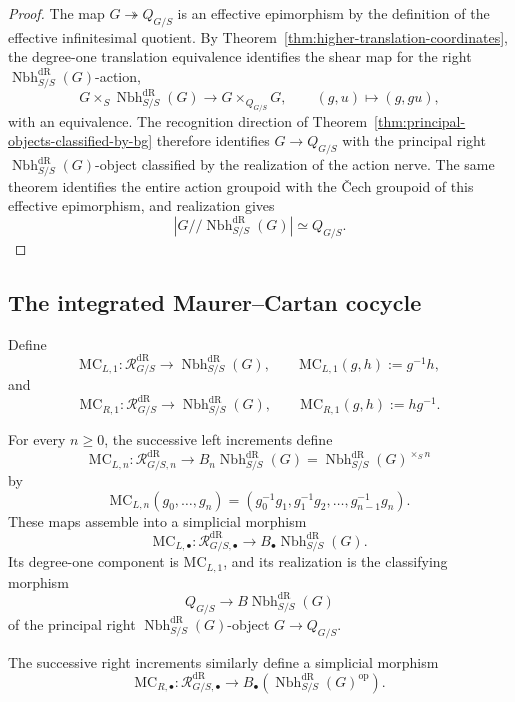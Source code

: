 \begin{proof}
The map $G\twoheadrightarrow Q_{G/S}$ is an effective epimorphism by the
definition of the effective infinitesimal quotient.  By
Theorem~\ref{thm:higher-translation-coordinates}, the degree-one translation
equivalence identifies the shear map for the right $\operatorname{Nbh}^{\mathrm{dR}}_{S/S}(G)$-action,
\[
    G\times_S\operatorname{Nbh}^{\mathrm{dR}}_{S/S}(G)
    \longrightarrow
    G\times_{Q_{G/S}}G,
    \qquad
    (g,u)\longmapsto(g,gu),
\]
with an equivalence.  The recognition direction of
Theorem~\ref{thm:principal-objects-classified-by-bg} therefore identifies
$G\to Q_{G/S}$ with the principal right $\operatorname{Nbh}^{\mathrm{dR}}_{S/S}(G)$-object classified by the
realization of the action nerve.  The same theorem identifies
the entire action groupoid with the \v{C}ech groupoid of this effective
epimorphism, and realization gives
\[
    |G/\!/\operatorname{Nbh}^{\mathrm{dR}}_{S/S}(G)|\simeq Q_{G/S}.
\]
\end{proof}

\subsection{The integrated Maurer--Cartan cocycle}

\begin{definition}
\label{def:formal-mc-projections}
Define
\[
    \mathrm{MC}_{L,1}:
    \mathcal R^{\mathrm{dR}}_{G/S}\to\operatorname{Nbh}^{\mathrm{dR}}_{S/S}(G),
    \qquad
    \mathrm{MC}_{L,1}(g,h):=g^{-1}h,
\]
and
\[
    \mathrm{MC}_{R,1}:
    \mathcal R^{\mathrm{dR}}_{G/S}\to\operatorname{Nbh}^{\mathrm{dR}}_{S/S}(G),
    \qquad
    \mathrm{MC}_{R,1}(g,h):=hg^{-1}.
\]
\end{definition}

\begin{theorem}
\label{thm:integrated-mc-cocycle}
For every $n\geq0$, the successive left increments define
\[
    \mathrm{MC}_{L,n}:
    \mathcal R^{\mathrm{dR}}_{G/S,n}\longrightarrow B_n\operatorname{Nbh}^{\mathrm{dR}}_{S/S}(G)=\operatorname{Nbh}^{\mathrm{dR}}_{S/S}(G)^{\times_Sn}
\]
by
\[
    \mathrm{MC}_{L,n}(g_0,\ldots,g_n)
    =
    \left(
        g_0^{-1}g_1,
        g_1^{-1}g_2,
        \ldots,
        g_{n-1}^{-1}g_n
    \right).
\]
These maps assemble into a simplicial morphism
\[
    \mathrm{MC}_{L,\bullet}:
    \mathcal R^{\mathrm{dR}}_{G/S,\bullet}\longrightarrow B_\bullet\operatorname{Nbh}^{\mathrm{dR}}_{S/S}(G).
\]
Its degree-one component is $\mathrm{MC}_{L,1}$, and its realization is the
classifying morphism
\[
    Q_{G/S}\longrightarrow B\operatorname{Nbh}^{\mathrm{dR}}_{S/S}(G)
\]
of the principal right $\operatorname{Nbh}^{\mathrm{dR}}_{S/S}(G)$-object $G\to Q_{G/S}$.

The successive right increments similarly define a simplicial morphism
\[
    \mathrm{MC}_{R,\bullet}:
    \mathcal R^{\mathrm{dR}}_{G/S,\bullet}
    \longrightarrow
    B_\bullet(\operatorname{Nbh}^{\mathrm{dR}}_{S/S}(G)^{\mathrm{op}}).
\]
\end{theorem}

